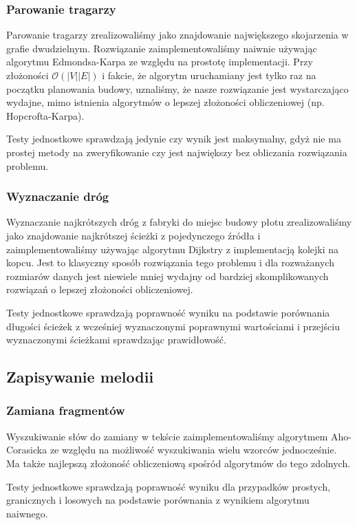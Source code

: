 \documentclass{article}
\begin{document}
\subsubsection{Parowanie tragarzy}
Parowanie tragarzy zrealizowaliśmy jako znajdowanie największego skojarzenia w grafie dwudzielnym.
Rozwiązanie zaimplementowaliśmy naiwnie używając algorytmu Edmondsa-Karpa ze względu na prostotę implementacji.
Przy złożoności \(\mathcal{O}(|V||E|)\)\cite{cs6820matchingnotes}
i fakcie, że algorytm uruchamiany jest tylko raz na początku planowania budowy,
uznaliśmy, że nasze rozwiązanie jest wystarczająco wydajne,
mimo istnienia algorytmów o lepszej złożoności obliczeniowej (np. Hopcrofta-Karpa).

\noindent Testy jednostkowe sprawdzają jedynie czy wynik jest maksymalny,
gdyż nie ma prostej metody na zweryfikowanie czy jest największy
bez obliczania rozwiązania problemu.
\subsubsection{Wyznaczanie dróg}
Wyznaczanie najkrótszych dróg z fabryki do miejsc budowy płotu zrealizowaliśmy
jako znajdowanie najkrótszej ścieżki z pojedynczego źródła
i zaimplementowaliśmy używając algorytmu Dijkstry z implementacją kolejki na kopcu.
Jest to klasyczny sposób rozwiązania tego problemu i dla rozważanych rozmiarów danych
jest niewiele mniej wydajny od bardziej skomplikowanych rozwiązań
o lepszej złożoności obliczeniowej.

\noindent Testy jednostkowe sprawdzają poprawność wyniku
na podstawie porównania długości ścieżek z wcześniej wyznaczonymi poprawnymi wartościami
i przejściu wyznaczonymi ścieżkami sprawdzając prawidłowość.

\subsection{Zapisywanie melodii}
\subsubsection{Zamiana fragmentów}
Wyszukiwanie słów do zamiany w tekście zaimplementowaliśmy algorytmem Aho-Corasicka
ze względu na możliwość wyszukiwania wielu wzorców jednocześnie.
Ma także najlepszą złożoność obliczeniową spośród algorytmów do tego zdolnych.

\noindent Testy jednostkowe sprawdzają poprawność wyniku
dla przypadków prostych, granicznych i losowych na podstawie porównania
z wynikiem algorytmu naiwnego.
\end{document}
